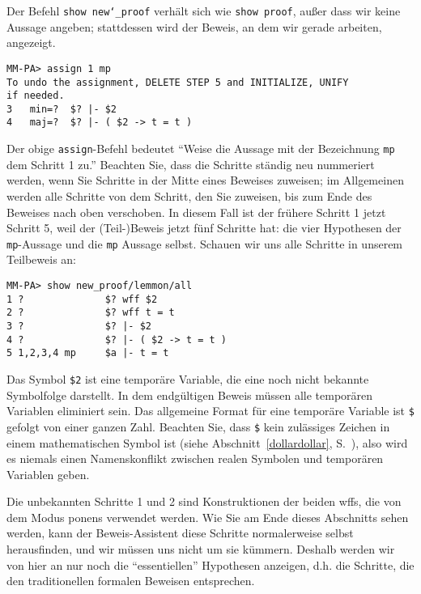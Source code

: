 Der Befehl \texttt{show new{\char`\_}proof} verhält sich wie \texttt{show proof}, außer dass wir keine Aussage angeben; stattdessen wird der Beweis, an dem wir gerade arbeiten, angezeigt.

\begin{verbatim}
MM-PA> assign 1 mp
To undo the assignment, DELETE STEP 5 and INITIALIZE, UNIFY
if needed.
3   min=?  $? |- $2
4   maj=?  $? |- ( $2 -> t = t )
\end{verbatim}

Der obige \texttt{assign}-Befehl bedeutet "`Weise die Aussage mit der Bezeichnung \texttt{mp} dem Schritt 1 zu."'  Beachten Sie, dass die Schritte ständig neu nummeriert werden, wenn Sie Schritte in der Mitte eines Beweises zuweisen; im Allgemeinen werden alle Schritte von dem Schritt, den Sie zuweisen, bis zum Ende des Beweises nach oben verschoben.  In diesem Fall ist der frühere Schritt 1 jetzt Schritt 5, weil der (Teil-)Beweis jetzt fünf Schritte hat: die vier Hypothesen der \texttt{mp}-Aussage und die \texttt{mp} Aussage selbst.  Schauen wir uns alle Schritte in unserem Teilbeweis an:

\begin{verbatim}
MM-PA> show new_proof/lemmon/all
1 ?              $? wff $2
2 ?              $? wff t = t
3 ?              $? |- $2
4 ?              $? |- ( $2 -> t = t )
5 1,2,3,4 mp     $a |- t = t
\end{verbatim}

Das Symbol \texttt{\$2} ist eine temporäre Variable, die eine noch nicht bekannte Symbolfolge darstellt.  In dem endgültigen Beweis müssen alle temporären Variablen eliminiert sein.  Das allgemeine Format für eine temporäre Variable ist \texttt{\$} gefolgt von einer ganzen Zahl.  Beachten Sie, dass \texttt{\$} kein zulässiges Zeichen in einem mathematischen Symbol ist (siehe Abschnitt~\ref{dollardollar}, S.~\pageref{dollardollar}), also wird es niemals einen Namenskonflikt zwischen realen Symbolen und temporären Variablen geben.

Die unbekannten Schritte 1 und 2 sind Konstruktionen der beiden wffs, die von dem Modus ponens verwendet werden.  Wie Sie am Ende dieses Abschnitts sehen werden, kann der Beweis-Assistent diese Schritte normalerweise selbst herausfinden, und wir müssen uns nicht um sie kümmern.  Deshalb werden wir von hier an nur noch die "`essentiellen"' Hypothesen anzeigen, d.h. die Schritte, die den traditionellen formalen Beweisen entsprechen.

